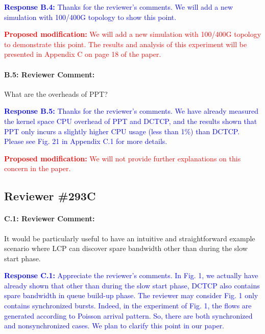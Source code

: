 \documentclass[12pt,one-column]{article}
\begin{document}
\noindent\textcolor{blue}{\textbf{Response B.4:}
Thanks for the reviewer’s comments. 
We will add a new simulation with 100/400G topology to show this point.
}

\noindent\textcolor{red}{\textbf{Proposed modification: }
We will add a new simulation with 100/400G topology to demonstrate this point. The results and analysis of this experiment will be presented in Appendix C on page 18 of the paper.
}


{\it \paragraph{B.5: Reviewer Comment:} What are the overheads of PPT?}

\noindent\textcolor{blue}{\textbf{Response B.5:}
Thanks for the reviewer’s comments. 
We have already measured the kernel space CPU overhead of PPT and DCTCP, and the results shown that PPT only incurs a slightly higher CPU usage (less than 1\%) than DCTCP. 
Please see Fig. 21 in Appendix C.1 for more details.
}

\noindent\textcolor{red}{\textbf{Proposed modification: }
We will not provide further explanations on this concern in the paper.
}

\subsection{Reviewer \#293C}
{\it \paragraph{C.1: Reviewer Comment:} It would be particularly useful to have an intuitive and straightforward example scenario where LCP can discover spare bandwidth other than during the slow start phase.}

\noindent\textcolor{blue}{\textbf{Response C.1:} 
Appreciate the reviewer’s comments. 
In Fig. 1, we actually have already shown that other than during the slow start phase, DCTCP also contains spare bandwidth in queue build-up phase. The reviewer may consider Fig. 1 only contains synchronized bursts. Indeed, in the experiment of Fig. 1, the flows are generated according to Poisson arrival  pattern. So, there are both synchronized and nonsynchronized cases. We plan to clarify this point in our paper.
}
\end{document}
